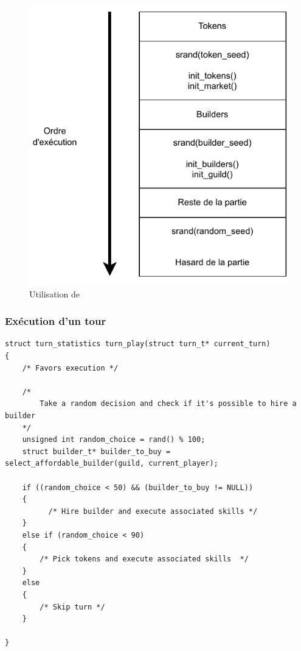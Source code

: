\begin{figure}[H]
    \centering
    \includegraphics{img/utilisation_srand.pdf}
    \caption{Utilisation de }
    \label{fig:sranduse}
\end{figure}

\subsubsection*{Exécution d'un tour}

\begin{lstlisting}[frame=single, caption={Implémentation de l'exécution d'un tour}]
struct turn_statistics turn_play(struct turn_t* current_turn)
{
    /* Favors execution */
    
	/*
        Take a random decision and check if it's possible to hire a builder
	*/
	unsigned int random_choice = rand() % 100; 
	struct builder_t* builder_to_buy = select_affordable_builder(guild, current_player);

	if ((random_choice < 50) && (builder_to_buy != NULL)) 
	{
		  /* Hire builder and execute associated skills */ 
	}
	else if (random_choice < 90)
	{
		/* Pick tokens and execute associated skills  */
	}
	else 
	{
		/* Skip turn */
	}

}
\end{lstlisting}

